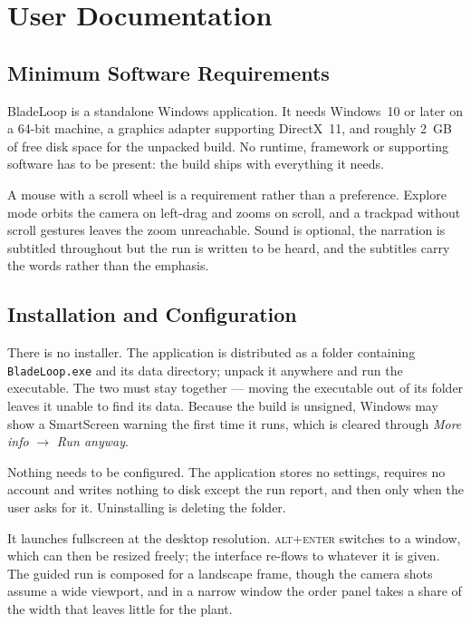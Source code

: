 \section{User Documentation}

\subsection{Minimum Software Requirements}

BladeLoop is a standalone Windows application. It needs Windows~10 or later on a 64-bit machine, a graphics adapter supporting DirectX~11, and roughly \SI{2}{GB} of free disk space for the unpacked build. No runtime, framework or supporting software has to be present: the build ships with everything it needs.

A mouse with a scroll wheel is a requirement rather than a preference. Explore mode orbits the camera on left-drag and zooms on scroll, and a trackpad without scroll gestures leaves the zoom unreachable. Sound is optional, the narration is subtitled throughout but the run is written to be heard, and the subtitles carry the words rather than the emphasis.

\subsection{Installation and Configuration}

There is no installer. The application is distributed as a folder containing \texttt{BladeLoop.exe} and its data directory; unpack it anywhere and run the executable. The two must stay together --- moving the executable out of its folder leaves it unable to find its data. Because the build is unsigned, Windows may show a SmartScreen warning the first time it runs, which is cleared through
\emph{More info} $\rightarrow$ \emph{Run anyway}.

Nothing needs to be configured. The application stores no settings, requires no account and writes nothing to disk except the run report, and then only when the user asks for it. Uninstalling is deleting the folder.

It launches fullscreen at the desktop resolution. \textsc{alt}+\textsc{enter} switches to a window, which can then be resized freely; the interface re-flows to whatever it is given. The guided run is composed for a landscape frame, though the camera shots assume a wide viewport, and in a narrow window the order panel takes a share of the width that leaves little for the plant.

